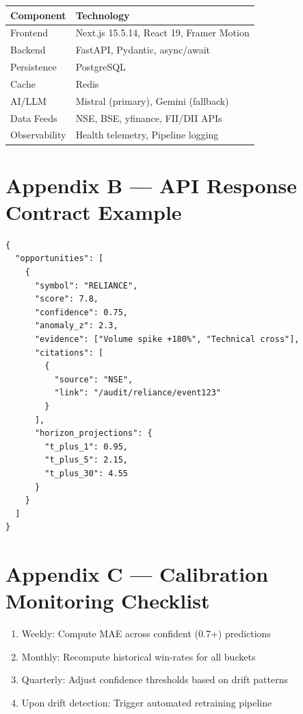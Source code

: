 \documentclass[11pt,a4paper]{article}
\begin{document}
\begin{tcolorbox}[colback=mn-light, colframe=mn-slate, arc=1mm, boxsep=10pt]
\small

\begin{tabular}{|l|l|}
\hline
\rowcolor{mn-slate!20}
\textbf{Component} & \textbf{Technology} \\
\hline
Frontend & Next.js 15.5.14, React 19, Framer Motion \\
\hline
Backend & FastAPI, Pydantic, async/await \\
\hline
Persistence & PostgreSQL \\
\hline
Cache & Redis \\
\hline
AI/LLM & Mistral (primary), Gemini (fallback) \\
\hline
Data Feeds & NSE, BSE, yfinance, FII/DII APIs \\
\hline
Observability & Health telemetry, Pipeline logging \\
\hline
\end{tabular}

\end{tcolorbox}

\section{Appendix B — API Response Contract Example}

\begin{verbatim}
{
  "opportunities": [
    {
      "symbol": "RELIANCE",
      "score": 7.8,
      "confidence": 0.75,
      "anomaly_z": 2.3,
      "evidence": ["Volume spike +180%", "Technical cross"],
      "citations": [
        {
          "source": "NSE",
          "link": "/audit/reliance/event123"
        }
      ],
      "horizon_projections": {
        "t_plus_1": 0.95,
        "t_plus_5": 2.15,
        "t_plus_30": 4.55
      }
    }
  ]
}
\end{verbatim}

\section{Appendix C — Calibration Monitoring Checklist}

\begin{enumerate}
    \item Weekly: Compute MAE across confident (0.7+) predictions
    \item Monthly: Recompute historical win-rates for all buckets
    \item Quarterly: Adjust confidence thresholds based on drift patterns
    \item Upon drift detection: Trigger automated retraining pipeline
\end{enumerate}
\end{document}
